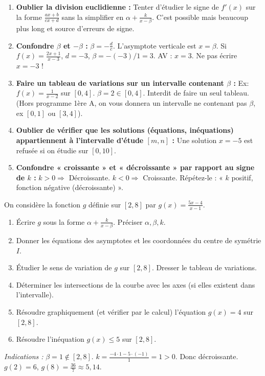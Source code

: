 \documentclass[11pt]{article}
\begin{document}
\begin{attention}
\begin{enumerate}
    \item \textbf{Oublier la division euclidienne :} Tenter d'étudier le signe de $f'(x)$ sur la forme $\frac{ax+b}{cx+d}$ sans la simplifier en $\alpha + \frac{k}{x-\beta}$. C'est possible mais beaucoup plus long et source d'erreurs de signe.
    \item \textbf{Confondre $\beta$ et $-\beta$ :} $\beta = -\frac{d}{c}$. L'asymptote verticale est $x = \beta$. Si $f(x) = \frac{2x+1}{x-3}$, $d=-3$, $\beta = -(-3)/1 = 3$. AV : $x=3$. Ne pas écrire $x=-3$ !
    \item \textbf{Faire un tableau de variations sur un intervalle contenant $\beta$ :} Ex: $f(x)=\frac{1}{x-2}$ sur $[0, 4]$. $\beta=2 \in [0,4]$. Interdit de faire un seul tableau. (Hors programme 1ère A, on vous donnera un intervalle ne contenant pas $\beta$, ex $[0,1]$ ou $[3,4]$).
    \item \textbf{Oublier de vérifier que les solutions (équations, inéquations) appartiennent à l'intervalle d'étude $[m, n]$ :} Une solution $x = -5$ est refusée si on étudie sur $[0, 10]$.
    \item \textbf{Confondre « croissante » et « décroissante » par rapport au signe de $k$ :} $k>0 \Rightarrow$ Décroissante. $k<0 \Rightarrow$ Croissante. Répétez-le : « $k$ positif, fonction négative (décroissante) ».
\end{enumerate}
\end{attention}

\begin{exercice}
On considère la fonction $g$ définie sur $[2, 8]$ par $g(x) = \frac{5x-4}{x-1}$.
\begin{enumerate}
    \item Écrire $g$ sous la forme $\alpha + \frac{k}{x-\beta}$. Préciser $\alpha, \beta, k$.
    \item Donner les équations des asymptotes et les coordonnées du centre de symétrie $I$.
    \item Étudier le sens de variation de $g$ sur $[2, 8]$. Dresser le tableau de variations.
    \item Déterminer les intersections de la courbe avec les axes (si elles existent dans l'intervalle).
    \item Résoudre graphiquement (et vérifier par le calcul) l'équation $g(x) = 4$ sur $[2, 8]$.
    \item Résoudre l'inéquation $g(x) \leq 5$ sur $[2, 8]$.
\end{enumerate}
\emph{Indications :} $\beta=1 \notin [2,8]$. $k = \frac{-4\cdot1 - 5\cdot(-1)}{1} = 1 > 0$. Donc décroissante. $g(2)=6$, $g(8)=\frac{36}{7}\approx 5,14$.
\end{exercice}
\end{document}
